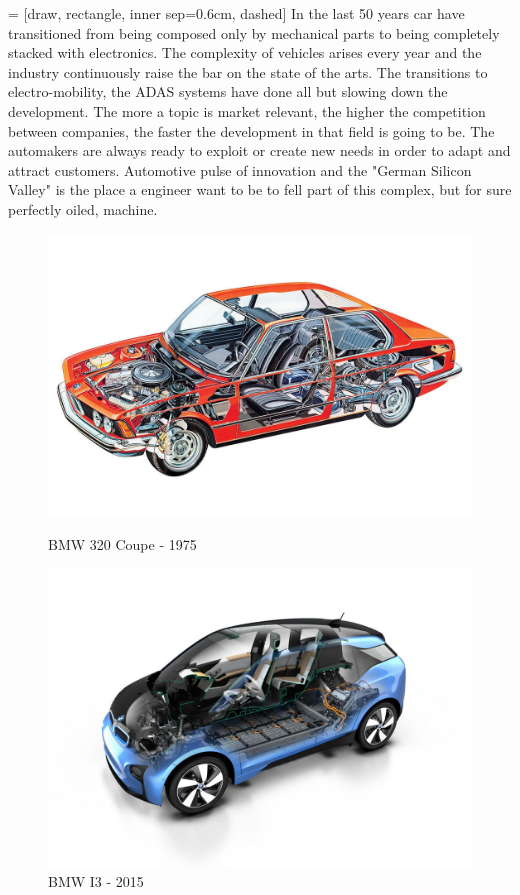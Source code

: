 \documentclass[../main.tex]{subfiles}
\begin{document}
 = [draw, rectangle, inner sep=0.6cm, dashed]
In the last 50 years car have transitioned from being composed only by mechanical parts to being completely stacked with electronics. The complexity of vehicles arises every year and the industry continuously raise the bar on the state of the arts. The transitions to electro-mobility, the ADAS systems have done all but slowing down the development. The more a topic is market relevant, the higher the competition between companies, the faster the development in that field is going to be. The automakers are always ready to exploit or create new needs in order to adapt and attract customers. Automotive pulse of innovation and the "German Silicon Valley" is the place a engineer want to be to fell part of this complex, but for sure perfectly oiled, machine.   
\begin{figure}
\centering
\begin{minipage}{.5\textwidth}
  \centering
  \includegraphics[width=\linewidth]{images_folder/4a56e1d50b56da42a10e29d451cf2b93.jpg}
  \caption{BMW 320 Coupe - 1975}
  \label{fig:test1}
\end{minipage}%
\begin{minipage}{.5\textwidth}
  \centering
  \includegraphics[width=\linewidth]{images_folder/BMW_i3.jpg}
  \caption{BMW I3 - 2015}
  \label{fig:test2}
\end{minipage}
\end{figure}
\end{document}
